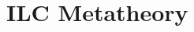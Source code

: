 \section{ILC Metatheory}
\label{sec:metatheory}

\begin{theorem}[Progress]

\end{theorem}

\begin{theorem}[Preservation]

\end{theorem}

\begin{theorem}[Confluence]

\end{theorem}
